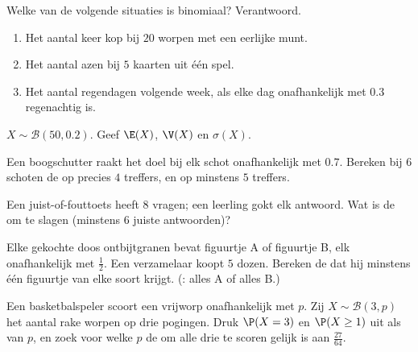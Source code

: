 \begin{exercise}[$\star$]\label{exo:g11:binom:3}
Welke van de volgende situaties is binomiaal? Verantwoord.
\begin{enumerate}
  \item Het aantal keer kop bij $20$ worpen met een eerlijke munt.
  \item Het aantal azen bij $5$ kaarten uit één spel.
  \item Het aantal regendagen volgende week, als elke dag onafhankelijk met
         $0.3$ regenachtig is.
\end{enumerate}
\end{exercise}

\begin{exercise}[$\star$]\label{exo:g11:binom:4}
$X \sim \mathcal B(50, 0.2)$. Geef $\E(X)$, $\V(X)$ en $\sigma(X)$.
\end{exercise}

\begin{exercise}[$\star\star$]\label{exo:g11:binom:5}
Een boogschutter raakt het doel bij elk schot onafhankelijk met  $0.7$.
Bereken bij $6$ schoten de  op precies $4$ treffers, en op minstens $5$
treffers.
\end{exercise}

\begin{exercise}[$\star\star$]\label{exo:g11:binom:6}
Een juist-of-fouttoets heeft $8$ vragen; een leerling gokt elk antwoord. Wat
is de  om te slagen (minstens $6$ juiste antwoorden)?
\end{exercise}

\begin{exercise}[$\star\star$]\label{exo:g11:binom:7}
Elke gekochte doos ontbijtgranen bevat figuurtje A of figuurtje B, elk
onafhankelijk met  $\frac12$. Een verzamelaar koopt $5$ dozen. Bereken de
 dat hij minstens één figuurtje van elke soort krijgt. (: alles
A of alles B.)
\end{exercise}

\begin{exercise}[$\star\star$]\label{exo:g11:binom:8}
Een basketbalspeler scoort een vrijworp onafhankelijk met  $p$. Zij
$X \sim \mathcal B(3, p)$ het aantal rake worpen op drie pogingen. Druk
$\P(X = 3)$ en $\P(X \geq 1)$ uit als  van $p$, en zoek voor welke
$p$ de  om alle drie te scoren gelijk is aan $\frac{27}{64}$.
\end{exercise}

